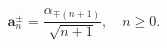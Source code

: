 \begin{equation}
\mathbf{a}_n^{\pm}=\frac{\alpha_{\mp (n+1)}}{\sqrt{n+1}},
\quad n\geqslant 0.
\end{equation}

